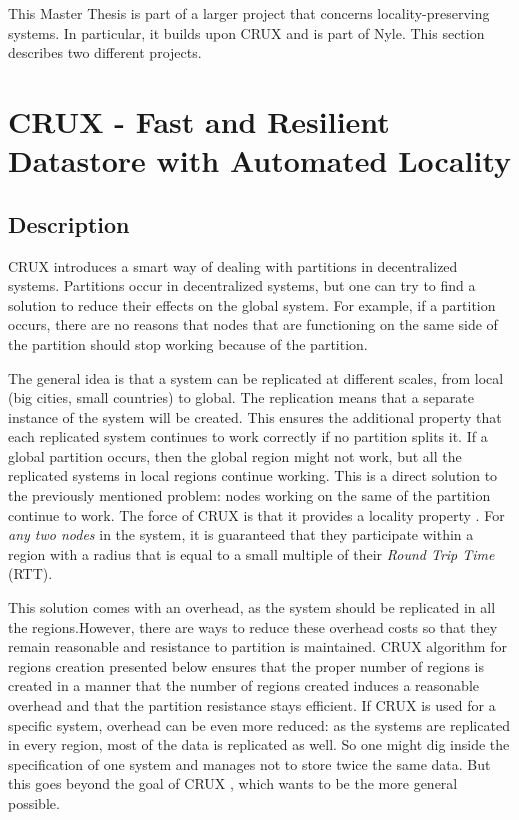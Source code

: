 \documentclass[a4paper,11pt,twoside,openright]{report}
\begin{document}

This Master Thesis is part of a larger project that concerns
locality-preserving systems. In particular, it builds upon
CRUX \cite{Basescu2014} and is part of Nyle. This section describes two
different projects. 

\section{CRUX - Fast and Resilient Datastore with Automated Locality}

\subsection{Description}
CRUX \cite{Basescu2014} introduces a smart way of dealing with partitions in
decentralized systems. Partitions occur in decentralized systems, but one can try to find a solution to reduce their effects on the global system. For
example, if a partition occurs, there are no reasons that nodes that are
functioning on the same side of the partition should stop working because of
the partition. 

The general idea is that a system can be replicated at different scales, from
local (big cities, small countries) to global. The replication means that a separate instance of the system will be created.  This ensures the additional property
that each replicated system continues to work correctly if no partition
splits it. If a global partition occurs, then the global region might not work,
but all the replicated systems in local regions continue working. This is a
direct solution to the previously mentioned problem: nodes working on the same
of the partition continue to work. The force of CRUX is that it provides a locality property  \cite{Basescu2014}. For \textit{any two nodes} in the system, it is guaranteed that they participate within a region with a radius that is equal to a small multiple of their \textit{Round Trip Time} (RTT).

This solution comes with an overhead, as the system should be replicated in all
the regions.However, there are ways to reduce these overhead costs so that they remain reasonable and resistance to partition is maintained. CRUX
algorithm for regions creation \cite{Basescu2014} presented below ensures that
the proper number of regions is created in a manner that the number of regions
created induces a reasonable overhead and that the partition resistance stays
efficient. If CRUX \cite{Basescu2014} is used for a specific system, overhead
can be even more reduced: as the systems are replicated in every region, most
of the data is replicated as well. So one might dig inside the specification of
one system and manages not to store twice the same data. But this goes beyond
the goal of CRUX \cite{Basescu2014}, which wants to be the more general
possible. 
\end{document}
